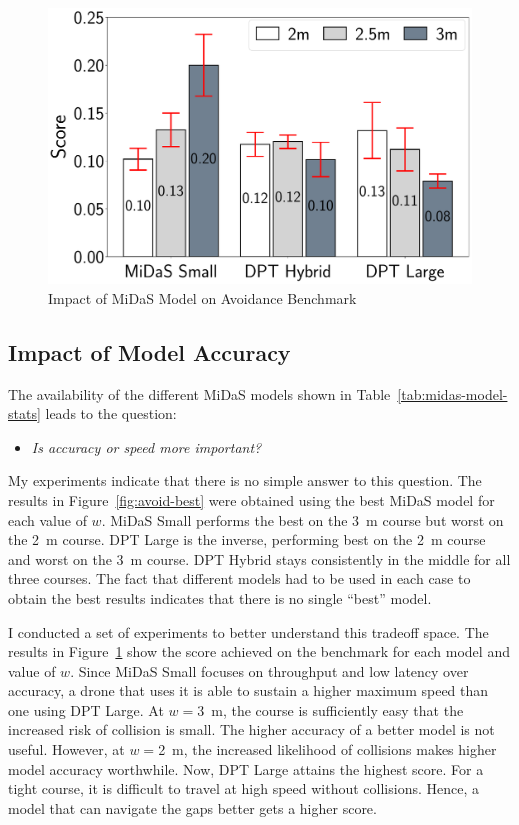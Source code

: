 \begin{figure}
\centering
\includegraphics[width=0.8\linewidth]{chapter6/FIGS/fig-avoidance-models.pdf}
\caption{Impact of MiDaS Model on Avoidance Benchmark}
\label{fig:avoidance_by_model}
\end{figure}


\subsection{Impact of Model Accuracy}
\label{sec:avoidance-models}
The availability of the different MiDaS models shown in
Table~\ref{tab:midas-model-stats} leads to the question:
\begin{itemize}
\item{\em Is accuracy or speed  more important?}
\end{itemize}
My experiments indicate that there is no simple answer to this
question.  The results in Figure~\ref{fig:avoid-best} were
obtained using the best MiDaS model for each value of $w$.  MiDaS
Small performs the best on the 3~m course but worst on the 2~m course.
DPT Large is the inverse, performing best on the 2~m course and worst
on the 3~m course.  DPT Hybrid stays consistently in the middle for
all three courses.  The fact that different models had to be used in
each case to obtain the best results indicates that there is no single
``best'' model.  

I conducted a set of experiments to better understand this tradeoff
space.  The results in Figure~\ref{fig:avoidance_by_model} show the
score achieved on the benchmark for each model and value of $w$.
Since MiDaS Small focuses on throughput and low latency over accuracy,
a drone that uses it is able to sustain a higher maximum speed than
one using DPT Large.  At $w = $3~m, the course is sufficiently easy
that the increased risk of collision is small.  The higher accuracy of
a better model is not useful.  However, at $w = $2~m, the increased
likelihood of collisions makes higher model accuracy worthwhile.  Now,
DPT Large attains the highest score.  For a tight course, it is
difficult to travel at high speed without collisions. Hence, a model
that can navigate the gaps better gets a higher  score.

